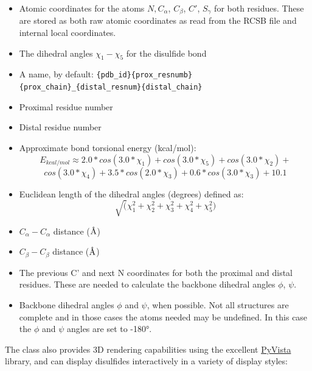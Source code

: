 \begin{itemize}
\tightlist
\item
  Atomic coordinates for the atoms \(N, C_{\alpha}\), \(C_{\beta}\),
  \(C'\), \(S_\gamma\) for both residues. These are stored as both raw
  atomic coordinates as read from the RCSB file and internal local
  coordinates.
\item
  The dihedral angles \(\chi_{1} - \chi_{5}\) for the disulfide bond
\item
  A name, by default:
  \texttt{\{pdb\_id\}\{prox\_resnumb\}\{prox\_chain\}\_\{distal\_resnum\}\{distal\_chain\}}
\item
  Proximal residue number
\item
  Distal residue number
\item
  Approximate bond torsional energy (kcal/mol): \[
    E_{kcal/mol} \approx 2.0 * cos(3.0 * \chi_{1}) + cos(3.0 * \chi_{5}) + cos(3.0 * \chi_{2}) +
  \] \[
    cos(3.0 * \chi_{4}) + 3.5 * cos(2.0 * \chi_{3}) + 0.6 * cos(3.0 * \chi_{3}) + 10.1
  \]
\item
  Euclidean length of the dihedral angles (degrees) defined as:
  \[\sqrt(\chi_{1}^{2} + \chi_{2}^{2} + \chi_{3}^{2} + \chi_{4}^{2} + \chi_{5}^{2})\]
\item
  \(C_{\alpha} - C_{\alpha}\) distance (\(\text{\normalfont\AA}\))
\item
  \(C_{\beta} - C_{\beta}\) distance (\(\text{\normalfont\AA}\))
\item
  The previous C' and next N coordinates for both the proximal and
  distal residues. These are needed to calculate the backbone dihedral
  angles \(\phi\), \(\psi\).
\item
  Backbone dihedral angles \(\phi\) and \(\psi\), when possible. Not all
  structures are complete and in those cases the atoms needed may be
  undefined. In this case the \(\phi\) and \(\psi\) angles are set to
  -180°.
\end{itemize}

The class also provides 3D rendering capabilities using the excellent
\href{https://pyvista.org}{PyVista} library, and can display disulfides
interactively in a variety of display styles:

